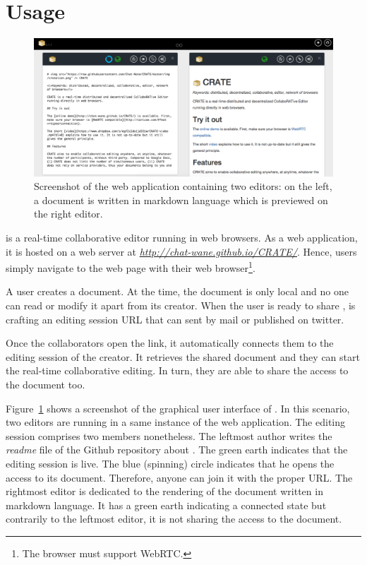 
\section{Usage}

\begin{figure}
  \includegraphics[width=\textwidth]{./img/screenshot.png}
  \caption{\label{img:screenshot} Screenshot of the web application containing
    two editors: on the left, a document is written in markdown language which
    is previewed on the right editor.}
\end{figure}

\CRATE is a real-time collaborative editor running in web browsers. As a web
application, it is hosted on a web server at
\emph{\url{http://chat-wane.github.io/CRATE/}}. Hence, users simply navigate to
the web page with their web browser\footnote{The browser must support WebRTC.}.

A user creates a document. At the time, the document is only local and
no one can read or modify it apart from its creator. When the user is
ready to share , \CRATE is crafting an editing session URL that can
sent by mail or published on twitter. 

Once the collaborators open the link, it automatically connects them
to the editing session of the creator. It retrieves the shared
document and they can start the real-time collaborative editing. In
turn, they are able to share the access to the document too. 

Figure~\ref{img:screenshot} shows a screenshot of the graphical user interface
of \CRATE. In this scenario, two editors are running in a same instance of the
web application. The editing session comprises two members nonetheless. The
leftmost author writes the \emph{readme} file of the Github repository about
\CRATE. The green earth indicates that the editing session is live. The blue
(spinning) circle indicates that he opens the access to its document. Therefore,
anyone can join it with the proper URL. The rightmost editor is dedicated to the
rendering of the document written in markdown language. It has a green earth
indicating a connected state but contrarily to the leftmost editor, it is not
sharing the access to the document.


